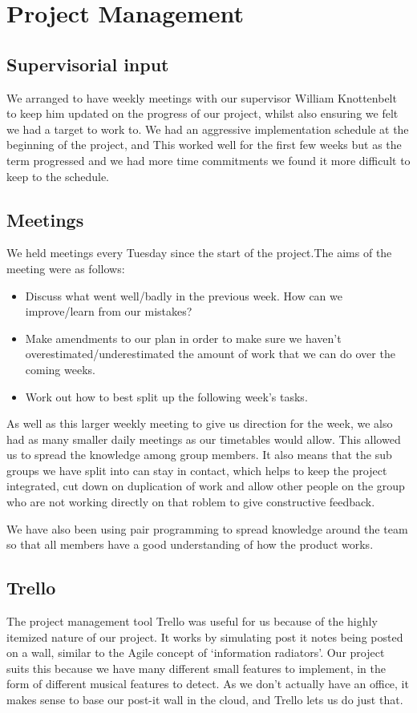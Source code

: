 \section{Project Management}
\subsection{Supervisorial input}
We arranged to have weekly meetings with our supervisor William Knottenbelt to keep him updated on the progress of our project, whilst also ensuring we felt we had a target to work to. We had an aggressive implementation schedule at the beginning of the project, and  This worked well for the first few weeks but as the term progressed and we had more time commitments we found it more difficult to keep to the schedule.
\subsection{Meetings}
We held meetings every Tuesday since the start of the project.The aims of the meeting were as follows:
\begin{itemize}
	\item Discuss what went well/badly in the previous week. How can we improve/learn from our mistakes?
	\item Make amendments to our plan in order to make sure we haven't overestimated/underestimated the amount of work that we can do over the coming weeks.
	\item Work out how to best split up the following week's tasks.
\end{itemize}
As well as this larger weekly meeting to give us direction for the week, we also had as many smaller daily meetings as our timetables would allow. This allowed us to spread the knowledge among group members. It also means that the sub groups we have split into can stay in contact, which helps to keep the project integrated, cut down on duplication of work and allow other people on the group who are not working directly on that roblem to give constructive feedback.

We have also been using pair programming to spread knowledge around the team so that all members have a good understanding of how the product works. 

\subsection{Trello}
The project management tool Trello was useful for us because of the highly itemized nature of our project. It works by simulating post it notes being posted on a wall, similar to the Agile concept of \lq information radiators\rq . Our project suits this because we have many different small features to implement, in the form of different musical features to detect.  As we don't actually have an office, it makes sense to base our post-it wall in the cloud, and Trello lets us do just that.


